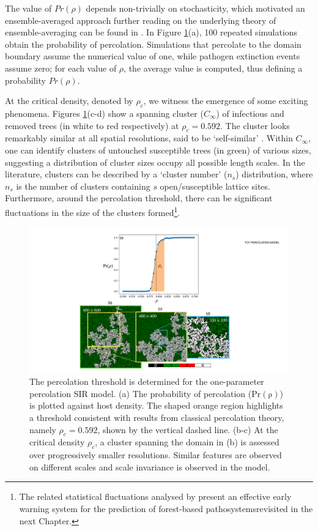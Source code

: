 The value of $Pr(\rho)$ depends non-trivially on stochasticity, which motivated an ensemble-averaged approach\textemdash 
further reading on the underlying theory of ensemble-averaging can be found in \cite{gibbs1902elementary}.
In Figure \ref{fig:ch3-perc}(a), 100 repeated simulations obtain the probability of percolation. Simulations that percolate to the domain boundary assume the numerical value of one, while pathogen extinction events assume zero; for each value of $\rho$, the average value is computed, thus defining a probability $Pr(\rho)$.

At the critical density, denoted by $\rho_c$, we witness the emergence of some exciting phenomena.
Figures \ref{fig:ch3-perc}(c-d) show a spanning cluster ($C_\infty$) of infectious and removed trees (in white to red respectively) at $\rho_c=0.592$.
The cluster looks remarkably similar at all spatial resolutions, said to be `self-similar' \cite{Kapitulnik_1983}.
Within $C_\infty$, one can identify clusters of untouched susceptible trees (in green) of various sizes, suggesting a distribution of cluster sizes occupy all possible length scales.
In the literature, clusters can be described by a `cluster number' ($n_s$) distribution, where $n_s$ is the number of clusters containing $s$ open/susceptible lattice sites.
Furthermore, around the percolation threshold, there can be significant fluctuations in the size of the clusters formed\footnote{
The related statistical fluctuations analysed by \cite{OROZCOFUENTES201912}
present an effective early warning system for the prediction of forest-based pathosystems\textemdash revisited in the next Chapter.
}.

\begin{figure}
    \centering
    \includegraphics[scale=0.4]{chapter3/figures/figure2-1param-perc-threshold.pdf}
    \caption{The percolation threshold is determined for the one-parameter percolation SIR model.
            (a) The probability of percolation ($\mathrm{Pr(\rho)}$) is plotted against host density.
            The shaped orange region highlights a threshold consistent with results from classical percolation theory, 
            namely $\rho_c = 0.592$, shown by the vertical dashed line. 
            (b-c) At the critical density $\rho_c$, a cluster spanning the domain in (b) is assessed over progressively smaller resolutions.
            Similar features are observed on different scales and scale invariance is observed in the model.
            }
    \label{fig:ch3-perc}
\end{figure}

